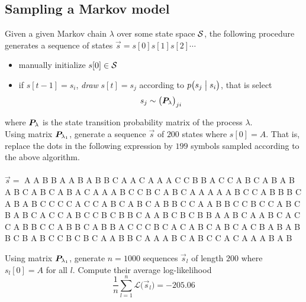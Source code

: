 
\color{black}
\subsection*{Sampling a Markov model}

Given a given Markov chain $\lambda$ over some state space $\mathcal{S}$, the following procedure generates a sequence of states $\vec{s} = s[0] s[1] s[2] \cdots$ 
\begin{itemize}
\item[] manually initialize $s[0] \in \mathcal{S}$
\item[] if $s[t-1] = s_i$, \emph{draw} $s[t] = s_j$ according to $p\bigl( s_j \bigm| s_i \bigr)$, that is select
\begin{equation*}
s_j \sim \bigl( \bm{P}_\lambda \bigr)_{ji}
\end{equation*}
\end{itemize}
where $\bm{P}_\lambda$ is the state transition probability matrix of the process $\lambda$. \\[1ex]

Using matrix $\bm{P}_{\lambda_1}$, generate a sequence $\vec{s}$ of $200$ states where $s[0] = A$. That is, replace the dots in the following expression by $199$ symbols sampled according to the above algorithm. 
\color{blue}
\\\\
$ \vec{s} = $ A A B B A A B A B B C A A C A A A C C B B A C C A B C A B A B A B C A B C A B A C A A A B C C B C A B C A A A A A B C C A B B B C A B A B C C C C A C C A B C A B C A B B C C A A B B C C B C C A B C B A B C A C C A B C C B C B B C A A B C B C B B A A B C A A B C A C C A B B C C A B B C A B B A C C C B C A C A B C A B C A C B A B A B B C B A B C C B C B C A A B B C A A A B C A B C C A C A A A B A B
\\ 
\color{black}

Using matrix $\bm{P}_{\lambda_1}$, generate $n=1000$ sequences $\vec{s}_l$ of length $200$ where $s_l[0] = A$ for all $l$. Compute their average log-likelihood 
\color{blue}
\begin{equation*}
\frac{1}{n} \sum_{l=1}^n  \mathcal{L}\bigl( \vec{s}_l \bigr) = -205.06
\end{equation*}
\color{black}